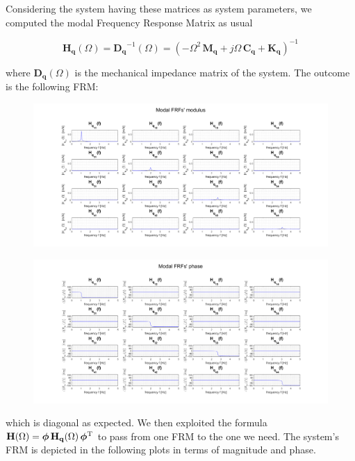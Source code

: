 \documentclass[a4paper,12pt,oneside]{article}
\begin{document}
Considering the system having these matrices as system parameters, we computed the modal Frequency Response Matrix as usual

\[
	\mathbf{H_q}(\Omega) = \mathbf{D_q}^{-1}(\Omega) =
		(-\Omega^2 \, \mathbf{M_q} + j \Omega \, \mathbf{C_q} + \mathbf{K_q})^{-1}
\]

where $ \mathbf{D_q}(\Omega) $ is the mechanical impedance matrix of the system. The outcome is the following FRM:

\begin{figure}[H]
	\hspace{-70pt}
	\includegraphics[scale=0.4]{modal_frfs_modulus}
\end{figure}

\begin{figure}[H]
	\hspace{-70pt}
	\includegraphics[scale=0.4]{modal_frfs_phase}
\end{figure}

which is diagonal as expected. We then exploited the formula $	\mathbf{H}(\Omega) = \bm{\phi} \, \mathbf{H_q}(\Omega) \, \bm{\phi}^\textup{T} $ to pass from one FRM to the one we need. The system's FRM is depicted in the following plots in terms of magnitude and phase.
\end{document}
